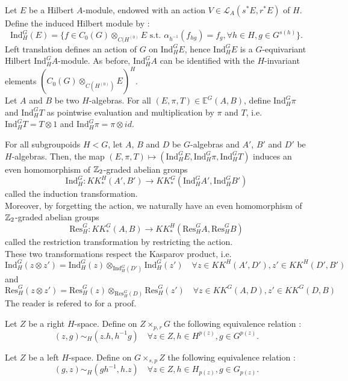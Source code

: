 Let $E$ be a Hilbert $A$-module, endowed with an action $V\in\mathcal L_A(s^*E,r^*E)$ of $H$. Define the induced Hilbert module by :
\[\text{Ind}_H^G (E) = \{f \in C_0(G)\otimes_{C(H^{(0)}} E \text{ s.t. } \alpha_{h^{-1}}(f_{hg}) = f_g,\forall h\in H,g\in G^{s(h)}\}. \]
Left translation defines an action of $G$ on $\text{Ind}_H^G E$, hence $\text{Ind}_H^G E$ is a $G$-equivariant Hilbert $\text{Ind}_H^G A$-module. As before, $\text{Ind}_H^G A$ can be identified with the $H$-invariant elements $(C_0(G)\otimes_{C(H^{(0)})} E)^H$.\\

Let $A$ and $B$ be two $H$-algebras. For all $(E,\pi,T)\in \mathbb E^G(A,B)$, define $\text{Ind}_H^G \pi$ and $\text{Ind}_H^G T$ as pointwise evaluation and multiplication by $\pi$ and $T$, i.e. $\text{Ind}_H^G T = T\otimes 1$ and $\text{Ind}_H^G \pi  = \pi\otimes id$.

\begin{definition}
For all subgroupoids $H<G$, let $A$, $B$ and $D$ be $G$-algebras and $A'$, $B'$ and $D'$ be $H$-algebras. Then, the map $(E,\pi,T)\mapsto ( \text{Ind}_H^G E, \text{Ind}_H^G\pi ,\text{Ind}_H^G T )$ induces an even homomorphism of $\mathbb Z_2$-graded abelian groups
\[\text{Ind}_H^G : KK_*^H(A',B')\rightarrow KK_*^G( \text{Ind}_H^G A', \text{Ind}_H^G B') \] 
called the induction transformation.\\
Moreover, by forgetting the action, we naturally have an even homomorphism of $\mathbb Z_2$-graded abelian groups 
\[\text{Res}_H^G : KK_*^G(A,B)\rightarrow KK_*^H( \text{Res}_H^G A, \text{Res}_H^G B) \] 
called the restriction transformation by restricting the action.\\
These two transformations respect the Kasparov product, i.e. 
\[ \text{Ind}_H^G(z\otimes z') = \text{Ind}_H^G(z)\otimes_{\text{Ind}_H^G(D')}\text{Ind}_H^G(z')\quad \forall z\in KK^H(A',D'),z'\in KK^H(D',B') \]
and 
\[ \text{Res}_H^G(z\otimes z') = \text{Res}_H^G(z)\otimes_{\text{Res}_H^G(D)}\text{Res}_H^G(z')\quad \forall z\in KK^G(A,D),z'\in KK^G(D,B) \]
The reader is refered to \cite{LeGall} for a proof.
\end{definition}   

Let $Z$ be a right $H$-space. Define on $Z\times_{p,r} G$ the following equivalence relation :
\[(z,g)\sim_H (z.h, h^{-1}g)\quad \forall z\in Z, h\in H^{p(z)},g\in G^{p(z)}.\]

Let $Z$ be a left $H$-space. Define on $G \times_{s,p} Z $ the following equivalence relation :
\[(g,z)\sim_H (gh^{-1}, h.z)\quad \forall z\in Z, h\in H_{p(z)},g\in G_{p(z)}.\]

